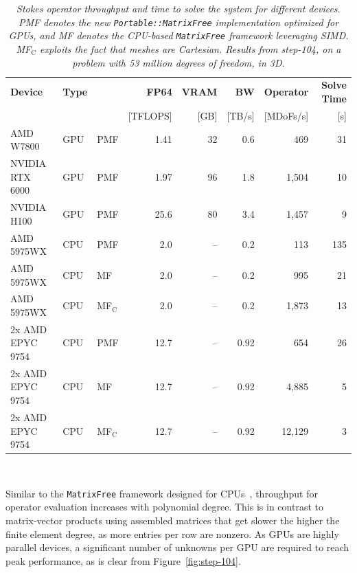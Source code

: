 \documentclass{ansarticle-preprint}
\begin{document}
\begin{table}[tbp]
 \caption{\it Stokes operator throughput and time to solve the system
   for different devices. PMF denotes the new \texttt{Portable::MatrixFree}
   implementation optimized for GPUs, and MF denotes the CPU-based
   \texttt{MatrixFree} framework leveraging SIMD. MF$_{\text{C}}$ exploits the fact that meshes are Cartesian. Results from
   step-104, on a problem with 53 million degrees of freedom, in 3D.}
 \label{fig:step-104b}

\centering
  \begin{tabular}{lllrrrrr}
    \toprule
    \bfseries Device & \bfseries Type & & \bfseries FP64 & \bfseries VRAM & \bfseries BW & \bfseries Operator & \bfseries Solve Time \\
    & & & [TFLOPS] & [GB] & [TB/s] & [MDoFs/s] & [s]
    \\[0.5em]
    AMD W7800       & GPU & PMF              & 1.41 & 32 & 0.6 & 469 & 31     \\
    NVIDIA RTX 6000 & GPU & PMF              & 1.97 & 96 & 1.8 & 1{,}504 & 10 \\
    NVIDIA H100     & GPU & PMF              & 25.6 & 80 & 3.4 & 1{,}457 & 9
    \\[0.25em]
    AMD 5975WX      & CPU & PMF              & 2.0 & -- & 0.2 & 113 & 135 \\
    AMD 5975WX      & CPU & MF & 2.0 & -- & 0.2 & 995 & 21
    \\
    AMD 5975WX      & CPU & MF$_{\text{C}}$ & 2.0 & -- & 0.2 & 1,873 & 13 \\[0.25em]
    2x AMD EPYC 9754   & CPU & PMF              & 12.7 & -- & 0.92 &      654 & 26 \\ %
    2x AMD EPYC 9754   & CPU & MF & 12.7 & -- & 0.92 &  4{,}885 & 5  \\ %
    2x AMD EPYC 9754   & CPU & MF$_{\text{C}}$               & 12.7 & -- & 0.92 & 12{,}129 & 3  \\ %
    \bottomrule
  \end{tabular}
  \\[0.25em]
\end{table}

Similar to the \texttt{MatrixFree} framework designed for
CPUs~\cite{KronbichlerKormann2012,KronbichlerKormann2019},
throughput for operator evaluation increases with polynomial
degree. This is in contrast to matrix-vector products using assembled
matrices that get slower the higher the finite element degree, as more
entries per row are nonzero. As GPUs are highly parallel devices, a
significant number of unknowns per GPU are required to reach peak
performance, as is clear from Figure~\ref{fig:step-104}.
\end{document}
